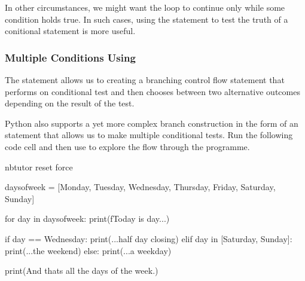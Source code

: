\documentclass[letterpaper,10pt,english]{sphinxmanual}
\begin{document}
In other circumstances, we might want the loop to continue only while some condition holds true. In such cases, using the  statement to test the truth of a conitional statement is more useful.


\subsubsection{Multiple Conditions Using }
\label{\detokenize{content/02_Robot_Lab/Section_00_02:Multiple-Conditions-Using-if..elif..else..}}
The  statement allows us to creating a branching control flow statement that performs on conditional test and then chooses between two alternative outcomes depending on the result of the test.

Python also supports a yet more complex branch construction in the form of an  statement that allows us to make multiple conditional tests. Run the following code cell and then use  to explore the flow through the programme.

{
\begin{sphinxVerbatim}[commandchars=\\\{\}]
\llap{\color{nbsphinxin}[ ]:\,\hspace{\fboxrule}\hspace{\fboxsep}}\PYGZpc{}\PYGZpc{}nbtutor \PYGZhy{}\PYGZhy{}reset \PYGZhy{}\PYGZhy{}force

days\PYGZus{}of\PYGZus{}week = [\PYGZsq{}Monday\PYGZsq{}, \PYGZsq{}Tuesday\PYGZsq{}, \PYGZsq{}Wednesday\PYGZsq{}, \PYGZsq{}Thursday\PYGZsq{},
                \PYGZsq{}Friday\PYGZsq{}, \PYGZsq{}Saturday\PYGZsq{}, \PYGZsq{}Sunday\PYGZsq{}]

for day in days\PYGZus{}of\PYGZus{}week:
    print(f\PYGZsq{}Today is \PYGZob{}day\PYGZcb{}...\PYGZsq{})

    if day == \PYGZsq{}Wednesday\PYGZsq{}:
        print(\PYGZsq{}...half day closing\PYGZsq{})
    elif day in [\PYGZsq{}Saturday\PYGZsq{}, \PYGZsq{}Sunday\PYGZsq{}]:
        print(\PYGZsq{}...the weekend\PYGZsq{})
    else:
        print(\PYGZsq{}...a weekday\PYGZsq{})

print(\PYGZdq{}And that\PYGZsq{}s all the days of the week.\PYGZdq{}\PYGZdq{})
\end{sphinxVerbatim}
}
\end{document}
